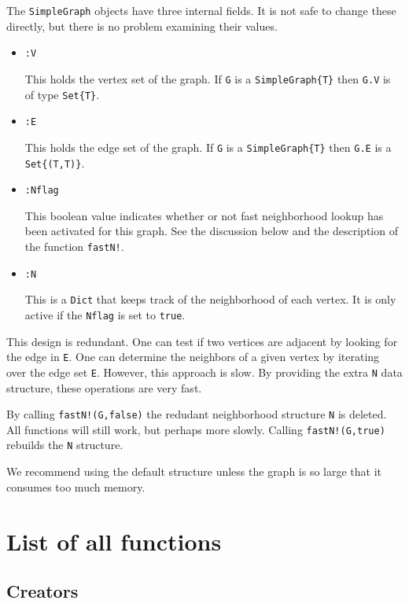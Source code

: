 \documentclass[oneside]{amsart}
\begin{document}
The \verb|SimpleGraph| objects have three internal fields. It is not
safe to change these directly, but there is no problem examining their
values.

\begin{itemize}
\item \verb|:V|

  This holds the vertex set of the graph. If \verb|G| is a
  \verb|SimpleGraph{T}| then \verb|G.V| is of type \verb|Set{T}|.

\item \verb|:E|

  This holds the edge set of the graph. If \verb|G| is a
  \verb|SimpleGraph{T}| then \verb|G.E| is a \verb|Set{(T,T)}|.

\item \verb|:Nflag|

  This boolean value indicates whether or not fast neighborhood lookup
  has been activated for this graph. See the discussion below and the
  description of the function \verb|fastN!|.

\item \verb|:N|

  This is a \verb|Dict| that keeps track of the neighborhood of each
  vertex. It is only active if the \verb|Nflag| is set to
  \verb|true|.

\end{itemize}



This design is redundant. One can test if two vertices are adjacent by
looking for the edge in \verb|E|.  One can determine the neighbors of
a given vertex by iterating over the edge set \verb|E|.  However, this
approach is slow. By providing the extra \verb|N| data structure,
these operations are very fast.

By calling \verb|fastN!(G,false)| the redudant neighborhood structure
\verb|N| is deleted. All functions will still work, but perhaps more
slowly. Calling \verb|fastN!(G,true)| rebuilds the \verb|N|
structure.

We recommend using the default structure unless the graph is so large
that it consumes too much memory.




\section{List of all functions}

\subsection*{Creators}
\end{document}

